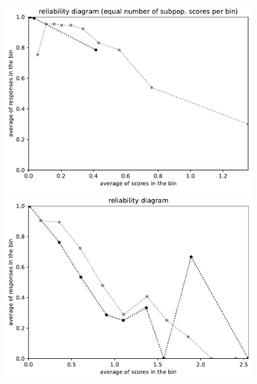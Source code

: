 \documentclass{article}
\newlength{\vertsep}
\newlength{\imsize}
\begin{document}
\begin{figure}
\begin{centering}
\parbox{\imsize}{\includegraphics[width=\imsize]
{../codes/unweighted/nll-1-323-monarch-monarch-butterfly-milkweed-butterfly-Danaus-plexippus_342-wild-boar-boar-Sus-scrofaequisamps10.pdf}}
\quad\quad
\parbox{\imsize}{\includegraphics[width=\imsize]
{../codes/unweighted/nll-1-323-monarch-monarch-butterfly-milkweed-butterfly-Danaus-plexippus_342-wild-boar-boar-Sus-scrofaequiscore10.pdf}}

\vspace{\vertsep}


\end{centering}
\end{figure}
\end{document}
